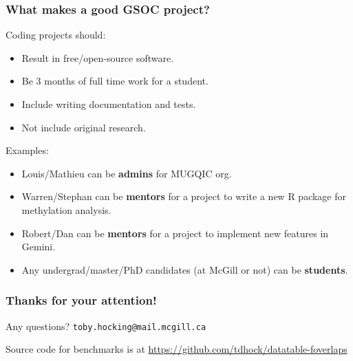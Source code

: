 \documentclass{beamer}
\begin{document}
\begin{frame}
  \frametitle{What makes a good GSOC project?}
  Coding projects should:
  \begin{itemize}
  \item Result in free/open-source software.
  \item Be 3 months of full time work for a student.
  \item Include writing documentation and tests.
  \item Not include original research.
  \end{itemize}
  Examples: 
  \begin{itemize}
  \item Louis/Mathieu can be \textbf{admins} for MUGQIC org.
  \item Warren/Stephan can be \textbf{mentors} for a project to write
    a new R package for methylation analysis.
  \item Robert/Dan can be \textbf{mentors} for a project to implement
    new features in Gemini.
  \item Any undergrad/master/PhD candidates (at McGill or not)
    can be \textbf{students}.
  \end{itemize}
  
\end{frame}

\begin{frame}
  \frametitle{Thanks for your attention!}
  Any questions? \texttt{toby.hocking@mail.mcgill.ca}

  \vskip 1cm

  Source code for benchmarks is at
  \url{https://github.com/tdhock/datatable-foverlaps}
\end{frame}
\end{document}
